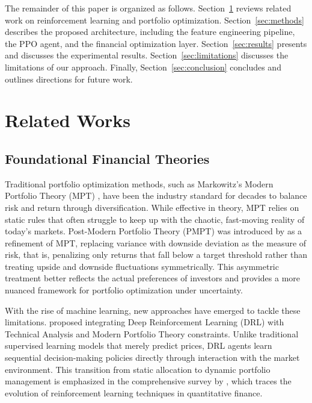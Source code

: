 \documentclass[final]{article}
\begin{document}
The remainder of this paper is organized as follows. Section~\ref{sec:related} reviews related work on reinforcement
learning and portfolio optimization. Section~\ref{sec:methods} describes the proposed architecture, including the
feature engineering pipeline, the PPO agent, and the financial optimization layer. Section~\ref{sec:results} presents
and discusses the experimental results. Section~\ref{sec:limitations} discusses the limitations of our approach. Finally,
Section~\ref{sec:conclusion} concludes and outlines directions for future work.

\section{Related Works}
\label{sec:related}
\subsection{Foundational Financial Theories}
Traditional portfolio optimization methods, such as Markowitz's Modern Portfolio Theory (MPT)
\citep{markowitz1952portfolio}, have been the industry standard for decades to balance risk and return through
diversification. While effective in theory, MPT relies on static rules that often struggle to keep up with the chaotic,
fast-moving reality of today's markets.
Post-Modern Portfolio Theory (PMPT) was introduced by \citet{rom1993postmodern} as a refinement of MPT, replacing
variance with downside deviation as the measure of risk, that is, penalizing only returns that fall below a target
threshold rather than treating upside and downside fluctuations symmetrically. This asymmetric treatment better reflects
the actual preferences of investors and provides a more nuanced framework for portfolio optimization under uncertainty.

With the rise of machine learning, new approaches have emerged to tackle these limitations. \citet{jang2023deep} proposed
integrating Deep Reinforcement Learning (DRL) with Technical Analysis and Modern Portfolio Theory constraints. Unlike
traditional supervised learning models that merely predict prices, DRL agents learn sequential decision-making policies
directly through interaction with the market environment. This transition from static allocation to dynamic portfolio
management is emphasized in the comprehensive survey by \citet{pippas2025evolution}, which traces the evolution of
reinforcement learning techniques in quantitative finance.
\end{document}
